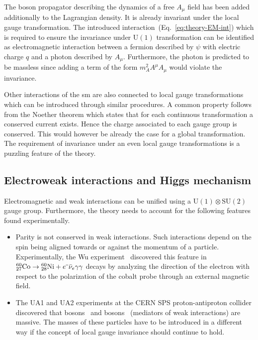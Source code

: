 The boson propagator describing the dynamics of a free $A_\mu$ field has been added additionally to the Lagrangian density. It is already invariant under the local gauge transformation. The introduced interaction~(Eq.~\ref{eq:theory-EM-int}) which is required to ensure the invariance under $\mathrm{U(1)}$ transformation can be identified as electromagnetic interaction between a fermion described by $\psi$ with electric charge $q$ and a photon described by $A_\mu$. Furthermore, the photon is predicted to be massless since adding a term of the form $m^{2}_{A}A^\mu A_\mu$ would violate the invariance.

Other interactions of the \gls{sm} are also connected to local gauge transformations which can be introduced through similar procedures. A common property follows from the Noether theorem which states that for each continuous transformation a conserved current exists. Hence the charge associated to each gauge group is conserved. This would however be already the case for a global transformation. The requirement of invariance under an even local gauge transformations is a puzzling feature of the theory. 

\subsection{Electroweak interactions and Higgs mechanism}
\label{sec:theory-ewk}

Electromagnetic and weak interactions can be unified using a $\mathrm{U(1)}\otimes \mathrm{SU(2)}$ gauge group. Furthermore, the theory needs to account for the following features found experimentally.

\begin{itemize}

\item Parity is not conserved in weak interactions. Such interactions depend on the spin being aligned towards or against the momentum of a particle. Experimentally, the Wu experiment~\cite{PhysRev.105.1413} discovered this feature in ${}_{27}^{60}\mathrm{Co}\to{}_{28}^{60}\mathrm{Ni}+e^{\rmminus}\bar{\nu}_{e}\gamma\gamma$ decays by analyzing the direction of the electron with respect to the polarization of the cobalt probe through an external magnetic field. 

\item The UA1 and UA2 experiments at the CERN SPS proton-antiproton collider discovered that \wboson bosons~\cite{Arnison:1983rp,Banner:1983jy} and \zboson bosons~\cite{Arnison:1983mk,Bagnaia:1983zx} (mediators of weak interactions) are massive. The masses of these particles have to be introduced in a different way if the concept of local gauge invariance should continue to hold.

\end{itemize}

